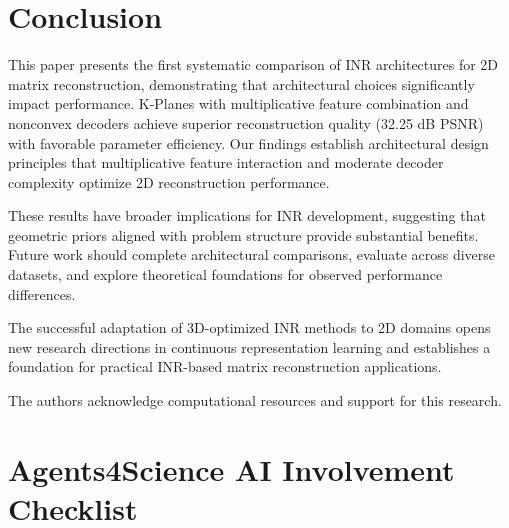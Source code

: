 \documentclass{article}
\begin{document}
\section{Conclusion}

This paper presents the first systematic comparison of INR architectures for 2D matrix reconstruction, demonstrating that architectural choices significantly impact performance. K-Planes with multiplicative feature combination and nonconvex decoders achieve superior reconstruction quality (32.25 dB PSNR) with favorable parameter efficiency. Our findings establish architectural design principles that multiplicative feature interaction and moderate decoder complexity optimize 2D reconstruction performance.

These results have broader implications for INR development, suggesting that geometric priors aligned with problem structure provide substantial benefits. Future work should complete architectural comparisons, evaluate across diverse datasets, and explore theoretical foundations for observed performance differences.

The successful adaptation of 3D-optimized INR methods to 2D domains opens new research directions in continuous representation learning and establishes a foundation for practical INR-based matrix reconstruction applications.

\begin{ack}
The authors acknowledge computational resources and support for this research.
\end{ack}




\newpage

\section*{Agents4Science AI Involvement Checklist}
\end{document}

